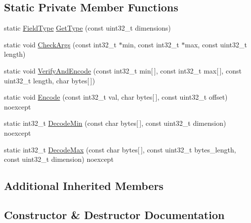 \subsection*{Static Private Member Functions}
\begin{DoxyCompactItemize}
\item 
static \mbox{\hyperlink{classlucene_1_1core_1_1document_1_1FieldType}{Field\+Type}} \mbox{\hyperlink{classlucene_1_1core_1_1document_1_1IntRange_a14e25efbf2dc2e230dbce3a546338bc2}{Get\+Type}} (const uint32\+\_\+t dimensions)
\item 
static void \mbox{\hyperlink{classlucene_1_1core_1_1document_1_1IntRange_a5b20608bad7100f0a7254a4fdad3898e}{Check\+Args}} (const int32\+\_\+t $\ast$min, const int32\+\_\+t $\ast$max, const uint32\+\_\+t length)
\item 
static void \mbox{\hyperlink{classlucene_1_1core_1_1document_1_1IntRange_a536d7453de3ac80b6aeba4597e1b65c1}{Verify\+And\+Encode}} (const int32\+\_\+t min\mbox{[}$\,$\mbox{]}, const int32\+\_\+t max\mbox{[}$\,$\mbox{]}, const uint32\+\_\+t length, char bytes\mbox{[}$\,$\mbox{]})
\item 
static void \mbox{\hyperlink{classlucene_1_1core_1_1document_1_1IntRange_a033f58b4f7e2faa72a8ce5e875da527a}{Encode}} (const int32\+\_\+t val, char bytes\mbox{[}$\,$\mbox{]}, const uint32\+\_\+t offset) noexcept
\item 
static int32\+\_\+t \mbox{\hyperlink{classlucene_1_1core_1_1document_1_1IntRange_a72ee8f2bcf5b827675b118ff73f650b4}{Decode\+Min}} (const char bytes\mbox{[}$\,$\mbox{]}, const uint32\+\_\+t dimension) noexcept
\item 
static int32\+\_\+t \mbox{\hyperlink{classlucene_1_1core_1_1document_1_1IntRange_a2f9b2a70823aa0ae838201b661e3cf9e}{Decode\+Max}} (const char bytes\mbox{[}$\,$\mbox{]}, const uint32\+\_\+t bytes\+\_\+length, const uint32\+\_\+t dimension) noexcept
\end{DoxyCompactItemize}
\subsection*{Additional Inherited Members}


\subsection{Constructor \& Destructor Documentation}
\mbox{\label{classlucene_1_1core_1_1document_1_1IntRange_a9572f1e81eb49c78f88db1337d0500c7}} 
